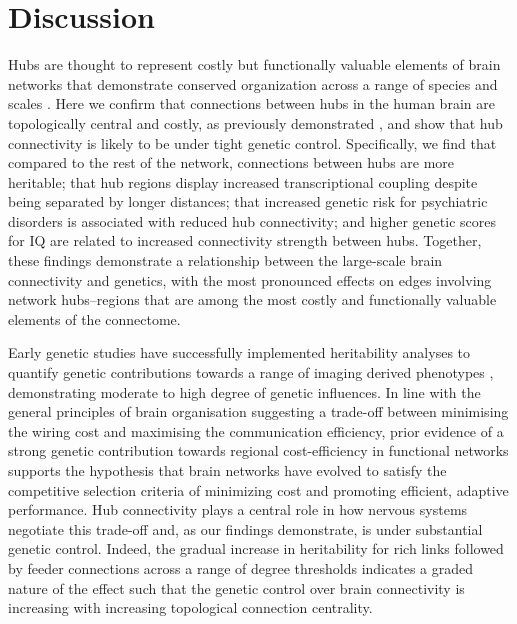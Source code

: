 \section{Discussion}

Hubs are thought to represent costly but functionally valuable elements of brain networks \citep{VandenHeuvel2012} that demonstrate conserved organization across a range of species and scales \citep{Harriger2012,Towlson2013,VandenHeuvel2011,Zamora-Lopez2010}. Here we confirm that connections between hubs in the human brain are topologically central and costly, as previously demonstrated \citep{VandenHeuvel2012}, and show that hub connectivity is likely to be under tight genetic control. Specifically, we find that compared to the rest of the network, connections between hubs are more heritable; that hub regions display increased transcriptional coupling despite being separated by longer distances; that increased genetic risk for psychiatric disorders is associated with reduced hub connectivity; and higher genetic scores for IQ are related to increased connectivity strength between hubs. Together, these findings demonstrate a relationship between the large-scale brain connectivity and genetics, with the most pronounced effects on edges involving network hubs--regions that are among the most costly and functionally valuable elements of the connectome. 

Early genetic studies have successfully implemented heritability analyses to quantify genetic contributions towards a range of imaging derived phenotypes \citep{Colclough2017,Fornito2011,Peper2007,Roshchupkin2016,Shen2014,Sinclair2015,Sudre2017,Thompson2001}, demonstrating moderate to high degree of genetic influences. In line with the general principles of brain organisation suggesting a trade-off between minimising the wiring cost and maximising the communication efficiency, prior evidence of a strong genetic contribution towards regional cost-efficiency in functional networks \citep{Fornito2011} supports the hypothesis that brain networks have evolved to satisfy the competitive selection criteria of minimizing cost and promoting efficient, adaptive performance. Hub connectivity plays a central role in how nervous systems negotiate this trade-off \citep{VandenHeuvel2013b}  and, as our findings demonstrate, is under substantial genetic control. Indeed, the gradual increase in heritability for rich links followed by feeder connections across a range of degree thresholds indicates a graded nature of the effect such that the genetic control over brain connectivity is increasing with increasing topological connection centrality. 

